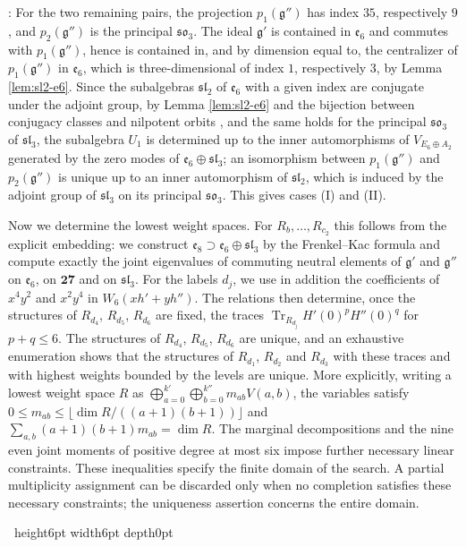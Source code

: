 \documentclass[leqno]{article}
\renewcommand{\leq}{\ensuremath{\leqslant}}
\newcommand{\qed}{\hfill \vrule height6pt  width6pt depth0pt}
\newenvironment{proof}[1][]{\noindent {\it Proof #1} : }{\hbox{~}\qed
\smallskip
}
\numberwithin{equation}{section}
\begin{document}
\begin{proof}
For the two remaining pairs, the projection $p_1(\mathfrak g'')$ has index $35$, respectively $9$, and $p_2(\mathfrak g'')$ is the principal $\mathfrak{so}_3$. The ideal $\mathfrak g'$ is contained in $\mathfrak e_6$ and commutes with $p_1(\mathfrak g'')$, hence is contained in, and by dimension equal to, the centralizer of $p_1(\mathfrak g'')$ in $\mathfrak e_6$, which is three-dimensional of index $1$, respectively $3$, by Lemma \ref{lem:sl2-e6}. Since the subalgebras $\mathfrak{sl}_2$ of $\mathfrak e_6$ with a given index are conjugate under the adjoint group, by Lemma \ref{lem:sl2-e6} and the bijection between conjugacy classes and nilpotent orbits \cite[Chapter 3]{CoM93}, and the same holds for the principal $\mathfrak{so}_3$ of $\mathfrak{sl}_3$, the subalgebra $U_1$ is determined up to the inner automorphisms of $V_{E_6 \oplus A_2}$ generated by the zero modes of $\mathfrak e_6 \oplus \mathfrak{sl}_3$; an isomorphism between $p_1(\mathfrak g'')$ and $p_2(\mathfrak g'')$ is unique up to an inner automorphism of $\mathfrak{sl}_2$, which is induced by the adjoint group of $\mathfrak{sl}_3$ on its principal $\mathfrak{so}_3$. This gives cases (I) and (II).

Now we determine the lowest weight spaces. For $R_b,\ldots,R_{c_2}$ this follows from the explicit embedding: we construct $\mathfrak e_8 \supset \mathfrak e_6 \oplus \mathfrak{sl}_3$ by the Frenkel--Kac formula and compute exactly the joint eigenvalues of commuting neutral elements of $\mathfrak g'$ and $\mathfrak g''$ on $\mathfrak e_6$, on $\mathbf{27}$ and on $\mathfrak{sl}_3$. For the labels $d_j$, we use in addition the coefficients of $x^4y^2$ and $x^2y^4$ in $W_6(xh'+yh'')$. The relations then determine, once the structures of $R_{d_4}$, $R_{d_5}$, $R_{d_6}$ are fixed, the traces $\operatorname{Tr}_{R_{d_j}}H'(0)^pH''(0)^q$ for $p+q \leq 6$. The structures of $R_{d_4}$, $R_{d_5}$, $R_{d_6}$ are unique, and an exhaustive enumeration shows that the structures of $R_{d_1}$, $R_{d_2}$ and $R_{d_3}$ with these traces and with highest weights bounded by the levels are unique. More explicitly, writing a lowest weight space $R$ as $\bigoplus_{a=0}^{k'}\bigoplus_{b=0}^{k''}m_{ab}V(a,b)$, the variables satisfy $0 \leq m_{ab} \leq \lfloor\dim R/((a+1)(b+1))\rfloor$ and $\sum_{a,b}(a+1)(b+1)m_{ab} = \dim R$. The marginal decompositions and the nine even joint moments of positive degree at most six impose further necessary linear constraints. These inequalities specify the finite domain of the search. A partial multiplicity assignment can be discarded only when no completion satisfies these necessary constraints; the uniqueness assertion concerns the entire domain.


\end{proof}
\end{document}
